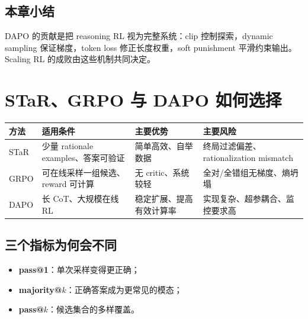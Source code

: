 \documentclass[a4paper]{article}
\begin{document}
\subsection{本章小结}

DAPO 的贡献是把 reasoning RL 视为完整系统：clip 控制探索，dynamic sampling 保证梯度，token loss 修正长度权重，soft punishment 平滑约束输出。Scaling RL 的成败由这些机制共同决定。

\section{STaR、GRPO 与 DAPO 如何选择}


\begin{table}[H]
\centering
\small
\begin{tabular}{>{\raggedright\arraybackslash}p{2.2cm}>{\raggedright\arraybackslash}p{3.6cm}>{\raggedright\arraybackslash}p{3.6cm}>{\raggedright\arraybackslash}p{4.0cm}}
\toprule
\textbf{方法} & \textbf{适用条件} & \textbf{主要优势} & \textbf{主要风险} \\
\midrule
STaR & 少量 rationale examples、答案可验证 & 简单高效、自举数据 & 终局过滤偏差、rationalization mismatch \\
GRPO & 可在线采样一组候选、reward 可计算 & 无 critic、系统较轻 & 全对/全错组无梯度、熵坍塌 \\
DAPO & 长 CoT、大规模在线 RL & 稳定扩展、提高有效计算率 & 实现复杂、超参耦合、监控要求高 \\
\bottomrule
\end{tabular}
\end{table}

\subsection{三个指标为何会不同}


\begin{itemize}
    \item \textbf{pass@1}：单次采样变得更正确；
    \item \textbf{majority@$k$}：正确答案成为更常见的模态；
    \item \textbf{pass@$k$}：候选集合的多样覆盖。
\end{itemize}
\end{document}
